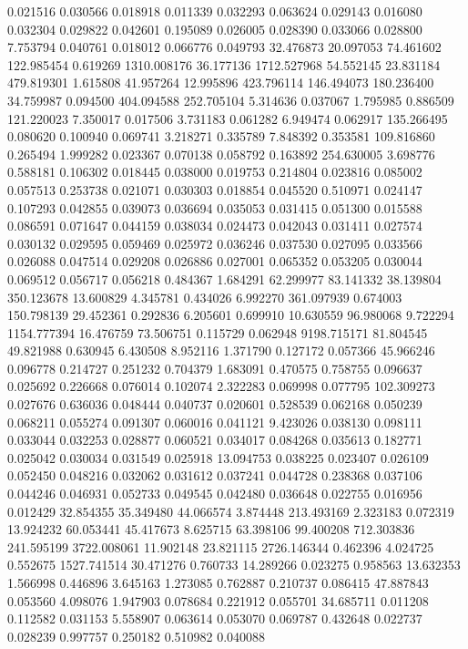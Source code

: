 0.021516
0.030566
0.018918
0.011339
0.032293
0.063624
0.029143
0.016080
0.032304
0.029822
0.042601
0.195089
0.026005
0.028390
0.033066
0.028800
7.753794
0.040761
0.018012
0.066776
0.049793
32.476873
20.097053
74.461602
122.985454
0.619269
1310.008176
36.177136
1712.527968
54.552145
23.831184
479.819301
1.615808
41.957264
12.995896
423.796114
146.494073
180.236400
34.759987
0.094500
404.094588
252.705104
5.314636
0.037067
1.795985
0.886509
121.220023
7.350017
0.017506
3.731183
0.061282
6.949474
0.062917
135.266495
0.080620
0.100940
0.069741
3.218271
0.335789
7.848392
0.353581
109.816860
0.265494
1.999282
0.023367
0.070138
0.058792
0.163892
254.630005
3.698776
0.588181
0.106302
0.018445
0.038000
0.019753
0.214804
0.023816
0.085002
0.057513
0.253738
0.021071
0.030303
0.018854
0.045520
0.510971
0.024147
0.107293
0.042855
0.039073
0.036694
0.035053
0.031415
0.051300
0.015588
0.086591
0.071647
0.044159
0.038034
0.024473
0.042043
0.031411
0.027574
0.030132
0.029595
0.059469
0.025972
0.036246
0.037530
0.027095
0.033566
0.026088
0.047514
0.029208
0.026886
0.027001
0.065352
0.053205
0.030044
0.069512
0.056717
0.056218
0.484367
1.684291
62.299977
83.141332
38.139804
350.123678
13.600829
4.345781
0.434026
6.992270
361.097939
0.674003
150.798139
29.452361
0.292836
6.205601
0.699910
10.630559
96.980068
9.722294
1154.777394
16.476759
73.506751
0.115729
0.062948
9198.715171
81.804545
49.821988
0.630945
6.430508
8.952116
1.371790
0.127172
0.057366
45.966246
0.096778
0.214727
0.251232
0.704379
1.683091
0.470575
0.758755
0.096637
0.025692
0.226668
0.076014
0.102074
2.322283
0.069998
0.077795
102.309273
0.027676
0.636036
0.048444
0.040737
0.020601
0.528539
0.062168
0.050239
0.068211
0.055274
0.091307
0.060016
0.041121
9.423026
0.038130
0.098111
0.033044
0.032253
0.028877
0.060521
0.034017
0.084268
0.035613
0.182771
0.025042
0.030034
0.031549
0.025918
13.094753
0.038225
0.023407
0.026109
0.052450
0.048216
0.032062
0.031612
0.037241
0.044728
0.238368
0.037106
0.044246
0.046931
0.052733
0.049545
0.042480
0.036648
0.022755
0.016956
0.012429
32.854355
35.349480
44.066574
3.874448
213.493169
2.323183
0.072319
13.924232
60.053441
45.417673
8.625715
63.398106
99.400208
712.303836
241.595199
3722.008061
11.902148
23.821115
2726.146344
0.462396
4.024725
0.552675
1527.741514
30.471276
0.760733
14.289266
0.023275
0.958563
13.632353
1.566998
0.446896
3.645163
1.273085
0.762887
0.210737
0.086415
47.887843
0.053560
4.098076
1.947903
0.078684
0.221912
0.055701
34.685711
0.011208
0.112582
0.031153
5.558907
0.063614
0.053070
0.069787
0.432648
0.022737
0.028239
0.997757
0.250182
0.510982
0.040088
